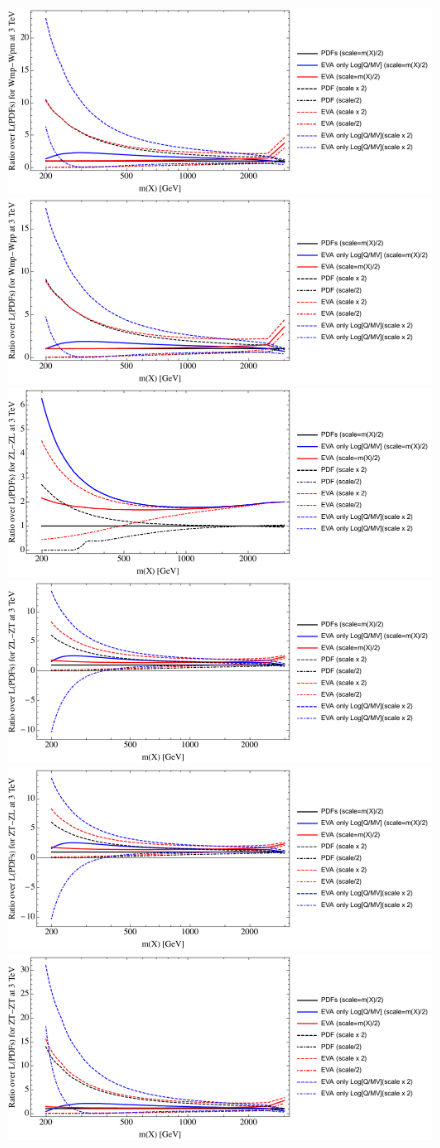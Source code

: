 \documentclass[a4paper,11pt]{article}
\begin{document}
\begin{figure}[ht]
\includegraphics[width=0.46\linewidth]{PlotLumi/3TeV/ratios/Wmp-Wpm.pdf}
\includegraphics[width=0.46\linewidth]{PlotLumi/3TeV/ratios/Wmp-Wpp.pdf}
\includegraphics[width=0.46\linewidth]{PlotLumi/3TeV/ratios/ZL-ZL.pdf}
\includegraphics[width=0.46\linewidth]{PlotLumi/3TeV/ratios/ZL-ZT.pdf}
\includegraphics[width=0.46\linewidth]{PlotLumi/3TeV/ratios/ZT-ZL.pdf}
\includegraphics[width=0.46\linewidth]{PlotLumi/3TeV/ratios/ZT-ZT.pdf}
\end{figure}
\end{document}

